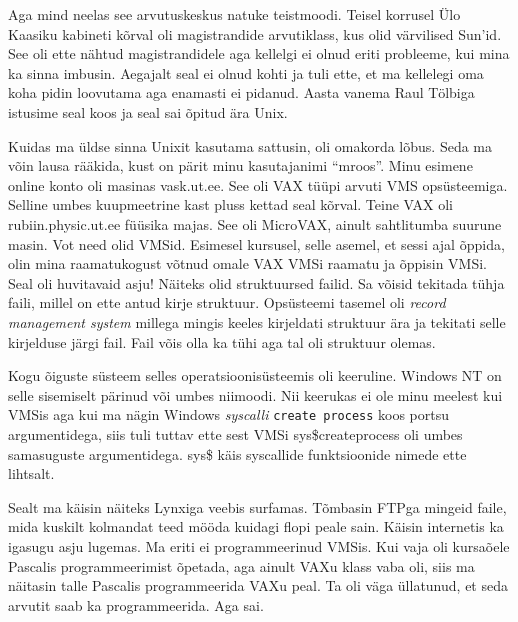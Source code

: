Aga mind neelas see arvutuskeskus natuke teistmoodi. Teisel korrusel Ülo Kaasiku kabineti kõrval oli magistrandide arvutiklass, kus olid värvilised Sun'id. See oli ette nähtud magistrandidele aga kellelgi ei olnud eriti probleeme, kui mina ka sinna imbusin. Aegajalt seal ei olnud kohti ja tuli ette, et ma kellelegi  oma koha pidin loovutama aga enamasti ei pidanud. Aasta vanema Raul Tölbiga istusime seal koos ja seal sai õpitud ära Unix. 

Kuidas ma üldse sinna Unixit kasutama sattusin, oli omakorda lõbus. Seda ma võin lausa rääkida, kust on pärit minu kasutajanimi \enquote{mroos}. Minu esimene online konto oli masinas vask.ut.ee. See oli VAX tüüpi arvuti VMS opsüsteemiga. Selline umbes kuupmeetrine kast pluss kettad seal kõrval. Teine VAX oli rubiin.physic.ut.ee füüsika majas. See oli MicroVAX, ainult sahtlitumba suurune masin. Vot need olid VMSid. Esimesel kursusel, selle asemel, et sessi ajal õppida, olin mina raamatukogust võtnud omale VAX VMSi raamatu ja õppisin VMSi. Seal oli huvitavaid asju! Näiteks olid struktuursed failid. Sa võisid tekitada tühja faili, millel on ette antud kirje struktuur. Opsüsteemi tasemel oli \emph{record management system} millega mingis keeles kirjeldati struktuur ära ja tekitati selle kirjelduse järgi fail. Fail võis olla ka tühi aga tal oli struktuur olemas. 

Kogu õiguste süsteem selles operatsioonisüsteemis oli keeruline. Windows NT on selle sisemiselt pärinud või umbes niimoodi. Nii keerukas ei ole minu meelest kui VMSis aga kui ma nägin Windows \emph{syscalli} \verb|create process| koos portsu argumentidega, siis tuli tuttav ette sest VMSi sys\$createprocess oli umbes samasuguste argumentidega. sys\$ käis syscallide funktsioonide nimede ette lihtsalt. 

Sealt ma käisin näiteks Lynxiga veebis surfamas. Tõmbasin FTPga mingeid faile, mida kuskilt kolmandat teed mööda kuidagi flopi peale sain. Käisin internetis ka igasugu asju lugemas. Ma eriti ei programmeerinud VMSis. Kui vaja oli kursaõele Pascalis programmeerimist õpetada, aga ainult VAXu klass vaba oli, siis ma näitasin talle Pascalis programmeerida VAXu peal. Ta oli väga üllatunud, et seda arvutit saab ka programmeerida. Aga sai. 

